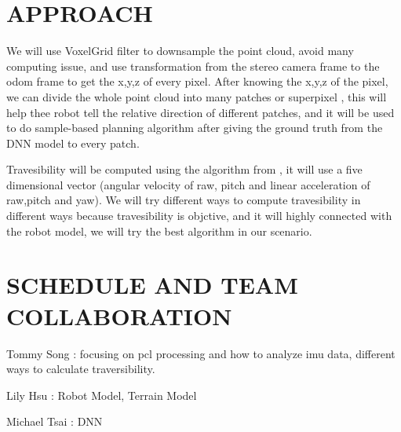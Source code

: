 \documentclass[letterpaper, 10 pt, conference]{ieeeconf}  %
\begin{document}
\section{APPROACH}
We will use VoxelGrid filter to downsample the point cloud, avoid many computing issue, and use transformation from the stereo camera frame to the odom frame to get the x,y,z of every pixel. After knowing the x,y,z of the pixel, we can divide the whole point cloud into many patches or superpixel \cite{kim2007traversability}, this will help thee robot tell the relative direction of different patches, and it will be used to do sample-based planning algorithm after giving the ground truth from the DNN model to every patch.

Travesibility will be computed using the algorithm from \cite{JiatongBao2012}, it will use a five dimensional vector (angular velocity of raw, pitch and linear acceleration of raw,pitch and yaw).
We will try different ways to compute travesibility in different ways because travesibility is objctive, and it will highly connected with the robot model, we will try the best algorithm in our scenario.

\section{SCHEDULE AND TEAM COLLABORATION}

Tommy Song : focusing on pcl processing and how to analyze imu data, different ways to calculate traversibility.

Lily Hsu : Robot Model, Terrain Model

Michael Tsai : DNN


  
\addtolength{\textheight}{-12cm}   %



\end{document}
